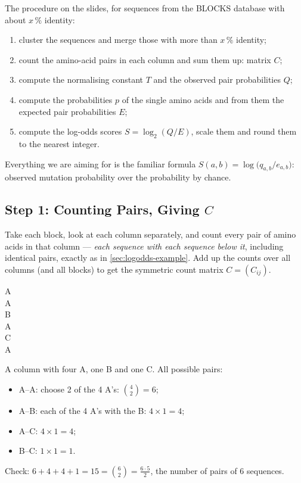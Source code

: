 \documentclass[11pt, oneside]{book}
\newcommand{\C}{\mathbb{C}}
\let\originalsubsection\subsection
\renewcommand{\subsection}{\Needspace{6\baselineskip}\originalsubsection}
\begin{document}
The procedure on the slides, for sequences from the BLOCKS database with
about $x\,\%$ identity:
\begin{enumerate}
  \item cluster the sequences and merge those with more than $x\,\%$ identity;
  \item count the amino-acid pairs in each column and sum them up: matrix $C$;
  \item compute the normalising constant $T$ and the observed pair
    probabilities $Q$;
  \item compute the probabilities $p$ of the single amino acids and from them
    the expected pair probabilities $E$;
  \item compute the log-odds scores $S = \log_2(Q/E)$, scale them and round
    them to the nearest integer.
\end{enumerate}
Everything we are aiming for is the familiar formula
$S(a,b) = \log \bigl(q_{a,b}/e_{a,b}\bigr)$: observed mutation probability over
the probability by chance.

\subsection{Step 1: Counting Pairs, Giving \texorpdfstring{$C$}{C}}

Take each block, look at each column separately, and count every pair of
amino acids in that column --- \emph{each sequence with each sequence below
it}, including identical pairs, exactly as in \cref{sec:logodds-example}.
Add up the counts over all columns (and all blocks) to get the symmetric count
matrix $C = (C_{ij})$.

\begin{exbox}[title={Possible pairings in one column}]
\begin{minipage}[c]{0.14\linewidth}
\centering\ttfamily
A\\A\\B\\A\\C\\A
\end{minipage}%
\begin{minipage}[c]{0.84\linewidth}
A column with four A, one B and one C. All possible pairs:
\begin{itemize}
  \item A--A: choose 2 of the 4 A's: $\binom{4}{2} = 6$;
  \item A--B: each of the 4 A's with the B: $4 \times 1 = 4$;
  \item A--C: $4 \times 1 = 4$;
  \item B--C: $1 \times 1 = 1$.
\end{itemize}
Check: $6 + 4 + 4 + 1 = 15 = \binom{6}{2} = \frac{6 \cdot 5}{2}$, the
number of pairs of 6 sequences. \checkmark
\end{minipage}
\end{exbox}
\end{document}
